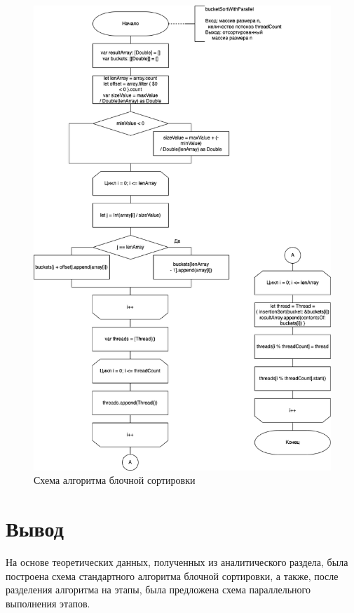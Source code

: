 \begin{figure}[h!]
	\centering
	\includegraphics[width=0.95\linewidth]{img/BucketParallel.png}
	\caption{Схема алгоритма блочной сортировки}
	\label{fig:mpr}
\end{figure}


\section{Вывод}
На основе теоретических данных, полученных из аналитического раздела, была построена схема стандартного алгоритма блочной сортировки, а также, после разделения алгоритма на этапы, была предложена схема параллельного выполнения этапов.

